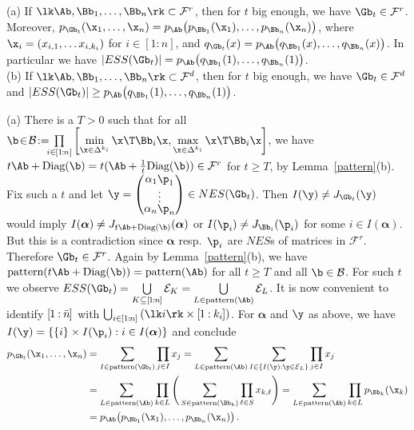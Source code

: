 \documentclass[moor]{informs3}              %
\def\irg#1#2{{ \in\! [{#1}\! : \! {#2}]}}
\def\sirg#1#2{{ \in\kern-.5pt [{#1}\kern-.5pt : \kern-.5pt {#2}]}}
\def\rg#1#2{{ [\kern-.5pt{#1}\kern-.5pt : \kern-.5pt {#2}\kern-.5pt]}}
\def\cowe#1{{#1}} %
\begin{document}
\begin{thm}\label{blob}
(a) If $\lk\Ab, \Bb_1,\ldots,\Bb_n\rk\subset\mathcal{F}^r$, then
for $t$ big enough, we have $\Gb_t\in\mathcal{F}^r$.\\
Moreover, $p_{\Gb_t}(\x_1,\ldots,\x_n)=p_{\Ab}\big(p_{\Bb_1}(\x_1),\ldots,p_{\Bb_n}(\x_n)\big)$, where $\x_i=(x_{i,1},\ldots x_{i,k_i})$ for $i\irg 1n$, and
$q_{\Gb_t}(x)=p_{\Ab}\big(q_{\Bb_1}(x),\ldots,q_{\Bb_n}(x)\big)$.
In particular we have $|ESS(\Gb_t)|=p_{\Ab}\big(q_{\Bb_1}(1),\ldots,q_{\Bb_n}(1)\big)$.\\
(b) If $\lk\Ab, \Bb_1,\ldots,\Bb_n\rk\subset\mathcal{F}^d$, then for $t$ big enough, we have $\Gb_t\in\mathcal{F}^d$ and
$|ESS(\Gb_t)|\ge p_{\Ab}\big(q_{\Bb_1}(1),\ldots,q_{\Bb_n}(1)\big)$.
\end{thm}
\bep
(a) There is a $T>0$ such that for all
$\b\!\in\!\mathcal{B}\!:=\!\!\!\prod\limits_{i\sirg 1n}\left[\min\limits_{\x\in\Delta^{k_i}}\x\T\Bb_i\x,\max\limits_{\x\in\Delta^{k_i}}\x\T\Bb_i\x\right]$,
we have $t\Ab+\textup{Diag}(\b)=t(\Ab+\tfrac1t\textup{Diag}(\b))\in \mathcal{F}^r$  for $t\ge T$, by Lemma~\ref{pattern}(b).
Fix such a $t$ and let $\renewcommand*{\arraystretch}{.5}\y=\begin{pmatrix}\alpha_1\p_1 \\ \vdots \\ \alpha_n\p_n \end{pmatrix}\in NES(\Gb_t)$. Then $I(\y)\ne J_{\cowe{\Gb_t}}(\y)$ would imply
$I(\bm{\alpha})\ne J_{\cowe{t\Ab+\textup{Diag}(\b)}}(\bm{\alpha})$
or $I(\p_i)\ne J_{\cowe{\Bb_i}}(\p_i)$ for some $i\in I(\bm{\alpha})$. But this is a contradiction since $\bm{\alpha}$ resp.\ $\p_i$ are $NES$s of matrices in $\mathcal{F}^r$.
Therefore $\Gb_t\in\mathcal{F}^r$.
Again by Lemma~\ref{pattern}(b),  we have $\textup{pattern}(t\Ab+\textup{Diag}(\b))=\textup{pattern}(\Ab)$ for all $t\ge T$ and all  $\b\in\mathcal{B}$. For such $t$ we observe
$ESS(\Gb_t)=\bigcup\limits_{K\subseteq \rg 1n}\mathcal{E}_K=\bigcup\limits_{L\in\textup{pattern}(\Ab)}\mathcal{E}_L $.
It is now convenient to identify $\rg1{\bar n}$ with $\bigcup_{i\sirg 1n} \left (\lk i\rk \times \rg1{k_i}\right )$.
For $\bm{\alpha}$ and $\y$ as above, we have
$I(\y)=\{\{i\}\times I(\p_{i}): i\in I(\bm{\alpha} )\}$ and conclude
\begin{align*}p_{\Gb_t}(\x_1,\ldots,\x_n)&=\sum\limits_{I\in\textup{pattern}(\Gb_t)}\prod\limits_{j\in I}x_j=\sum\limits_{L\in\textup{pattern}(\Ab)}\sum\limits_{I\in\{I(\y):\y\in\mathcal{E}_L\}}\prod\limits_{j\in I}x_j\\
&=\sum\limits_{L\in\textup{pattern}(\Ab)}\prod\limits_{k\in L}\Bigg(\sum\limits_{S\in\textup{pattern}(\Bb_k)}\prod\limits_{\ell\in S}x_{k,\ell}\Bigg)=\sum\limits_{L\in\textup{pattern}(\Ab)}\prod\limits_{k\in L}p_{\Bb_k}(\x_k)\\
&=p_{\Ab}\big(p_{\Bb_1}(\x_1),\ldots,p_{\Bb_n}(\x_n)\big)\, .
\end{align*}
\end{document}
